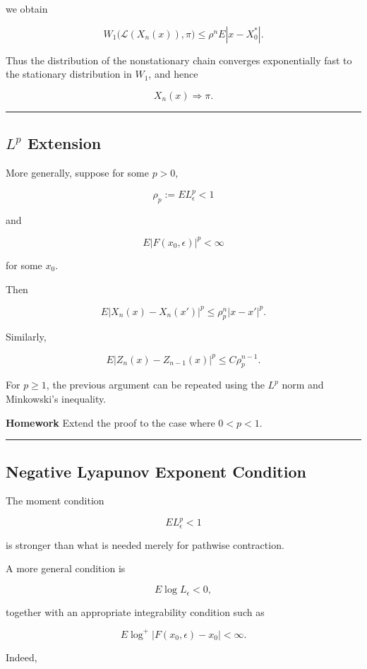we obtain

\[W_1\big(\mathcal L(X_n(x)),\pi\big)
\le
\rho^nE|x-X_0^*|.\]

Thus the distribution of the nonstationary chain converges exponentially fast to the stationary distribution in \(W_1\), and hence

\[X_n(x)\Rightarrow\pi.\]

\begin{center}\rule{0.5\linewidth}{0.5pt}\end{center}

\subsection*{\texorpdfstring{\(L^p\) Extension}{L\^{}p Extension}}
More generally, suppose for some \(p>0\),

\[\rho_p:=EL_\epsilon^p<1\]

and

\[E|F(x_0,\epsilon)|^p<\infty\]

for some \(x_0\).

Then

\[E|X_n(x)-X_n(x')|^p
\le
\rho_p^n|x-x'|^p.\]

Similarly,

\[E|Z_n(x)-Z_{n-1}(x)|^p
\le
C\rho_p^{n-1}.\]

For \(p\ge1\), the previous argument can be repeated using the \(L^p\) norm and Minkowski's inequality.

\textbf{Homework} Extend the proof to the case where \(0 < p < 1\).

\begin{center}\rule{0.5\linewidth}{0.5pt}\end{center}

\subsection*{Negative Lyapunov Exponent Condition}
The moment condition

\[EL_\epsilon^p<1\]

is stronger than what is needed merely for pathwise contraction.

A more general condition is

\[E\log L_\epsilon<0,\]

together with an appropriate integrability condition such as

\[E\log^+|F(x_0,\epsilon)-x_0|<\infty.\]

Indeed,

